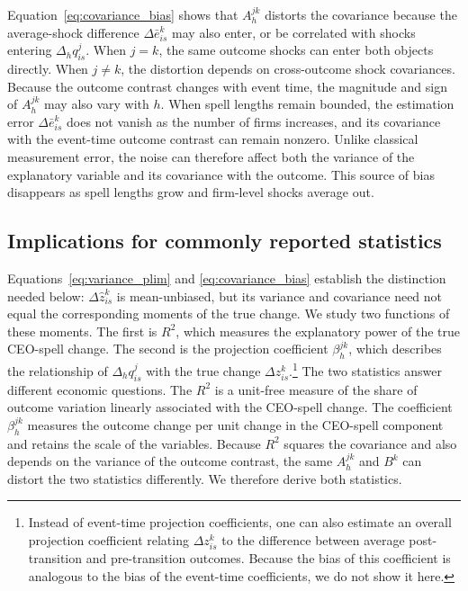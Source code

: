 \documentclass[sigconf,nonacm]{acmart}
\begin{document}
Equation~\eqref{eq:covariance_bias} shows that $A_h^{jk}$ distorts the covariance because the average-shock difference $\Delta\bar e_{is}^{k}$ may also enter, or be correlated with shocks entering $\Delta_h q_{is}^{j}$. When $j=k$, the same outcome shocks can enter both objects directly. When $j\neq k$, the distortion depends on cross-outcome shock covariances. Because the outcome contrast changes with event time, the magnitude and sign of $A_h^{jk}$ may also vary with $h$. When spell lengths remain bounded, the estimation error $\Delta\bar e_{is}^{k}$ does not vanish as the number of firms increases, and its covariance with the event-time outcome contrast can remain nonzero. Unlike classical measurement error, the noise can therefore affect both the variance of the explanatory variable and its covariance with the outcome. This source of bias disappears as spell lengths grow and firm-level shocks average out.

\subsection{Implications for commonly reported statistics}\label{subsec:implications}


Equations~\eqref{eq:variance_plim} and \eqref{eq:covariance_bias} establish the distinction needed below: $\Delta\widehat z_{is}^{k}$ is mean-unbiased, but its variance and covariance need not equal the corresponding moments of the true change. We study two functions of these moments. The first is $R^2$, which measures the explanatory power of the true CEO-spell change. The second is the projection coefficient $\beta_h^{jk}$, which describes the relationship of $\Delta_h q_{is}^{j}$ with the true change $\Delta z_{is}^{k}$.\footnote{Instead of event-time projection coefficients, one can also estimate an overall projection coefficient relating $\Delta z_{is}^{k}$ to the difference between average post-transition and pre-transition outcomes. Because the bias of this coefficient is analogous to the bias of the event-time coefficients, we do not show it here.}
The two statistics answer different economic questions. The $R^2$ is a unit-free measure of the share of outcome variation linearly associated with the CEO-spell change. The coefficient $\beta_h^{jk}$ measures the outcome change per unit change in the CEO-spell component and retains the scale of the variables. Because $R^2$ squares the covariance and also depends on the variance of the outcome contrast, the same $A_h^{jk}$ and $B^k$ can distort the two statistics differently. We therefore derive both statistics.
\end{document}
